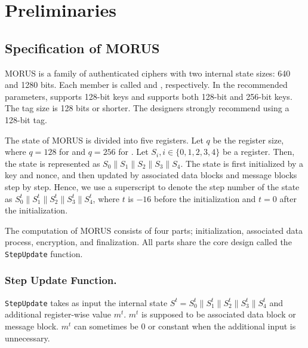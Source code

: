 \section{Preliminaries}
\label{Sec/Preliminaries}

\subsection{Specification of MORUS}
\label{subsec/Spec}
MORUS \cite{MORUS} is a family of authenticated ciphers with two internal state sizes: 640 and 1280 bits. Each member is called  and , respectively. In the recommended parameters,  supports 128-bit keys and  supports both 128-bit and 256-bit keys. The tag size is 128 bits or shorter. The designers strongly recommend using a 128-bit tag.

The state of MORUS is divided into five registers. Let $q$ be the register size, where $q = 128$ for  and $q=256$ for . Let $S_i, i \in\{0,1,2,3,4\}$ be a register. Then, the state is represented as $S_0\|S_1\|S_2\|S_3\|S_4$. The state is first initialized by a key and nonce, and then updated by associated data blocks and message blocks step by step. Hence, we use a superscript to denote the step number of the state as $S^t_0\|S^t_1\|S^t_2\|S^t_3\|S^t_4$, where $t$ is $-16$ before the initialization and $t=0$ after the initialization.

The computation of MORUS consists of four parts; initialization, associated data process, encryption, and finalization. All parts share the core design called the {\tt StepUpdate} function. %

\subsubsection{Step Update Function.}
{\tt StepUpdate} takes as input the internal state $S^t = S^t_0\|S^t_1\|S^t_2\|S^t_3\|S^t_4$ and additional register-wise value $m^t$. $m^t$ is supposed to be associated data block or message block. $m^t$ can sometimes be 0 or constant when the additional input is unnecessary.

